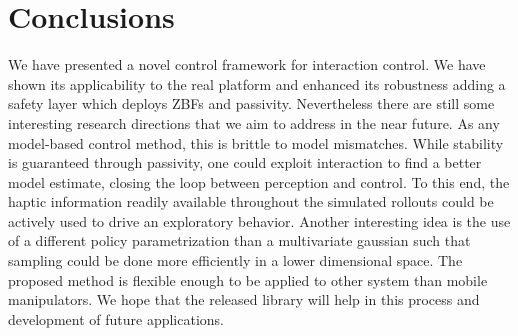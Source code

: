 \section{Conclusions} \label{sec:conclusions}
We have presented a novel control framework for interaction control. We have shown its applicability to the real platform and enhanced its robustness adding a safety layer which deploys ZBFs and passivity. Nevertheless there are still some interesting research directions that we aim to address in the near future. As any model-based control method, this is brittle to model mismatches. While stability is guaranteed through passivity, one could exploit interaction to find a better model estimate, closing the loop between perception and control. To this end, the haptic information readily available throughout the simulated rollouts could be actively used to drive an exploratory behavior. Another interesting idea is the use of a different policy parametrization than a multivariate gaussian such that sampling could be done more efficiently in a lower dimensional space. The proposed method is flexible enough to be applied to other system than mobile manipulators. We hope that the released library will help in this process and development of future applications. 